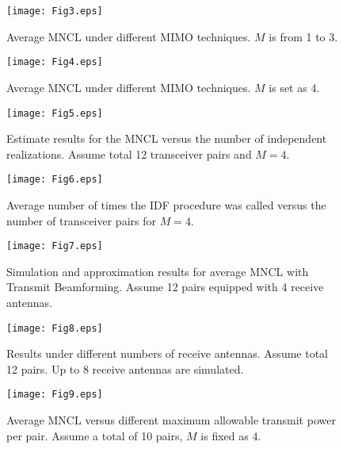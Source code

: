 \documentclass[draftcls,onecolumn,peerview,12pt]{IEEEtran}
\begin{document}
\begin{figure}
\centering
\texttt{[image: Fig3.eps]}
\caption{Average MNCL under different MIMO techniques. $M$ is from 1
to 3.} \label{Fig3}
\end{figure}

\begin{figure}
\centering
\texttt{[image: Fig4.eps]}
\caption{Average MNCL under different MIMO techniques. $M$ is set as
4.} \label{Fig4}
\end{figure}

\begin{figure}
\centering
\texttt{[image: Fig5.eps]}
\caption{Estimate results for the MNCL versus the number of
independent realizations. Assume total 12 transceiver pairs and
$M=4$.} \label{Fig5}
\end{figure}

\begin{figure}
\centering
\texttt{[image: Fig6.eps]}
\caption{Average number of times the IDF procedure was called versus
the number of transceiver pairs for $M=4$.} \label{Fig6}
\end{figure}

\begin{figure}
\centering
\texttt{[image: Fig7.eps]}
\caption{Simulation and approximation results for average MNCL with
Transmit Beamforming. Assume 12 pairs equipped with 4 receive
antennas.} \label{Fig7}
\end{figure}

\begin{figure}
\centering
\texttt{[image: Fig8.eps]}
\caption{Results under different numbers of receive antennas. Assume
total 12 pairs. Up to 8 receive antennas are simulated.}
\label{Fig8}
\end{figure}

\begin{figure}
\centering
\texttt{[image: Fig9.eps]}
\caption{Average MNCL versus different maximum allowable transmit
power per pair. Assume a total of 10 pairs, $M$ is fixed as 4.}
\label{Fig9}
\end{figure}
\end{document}
